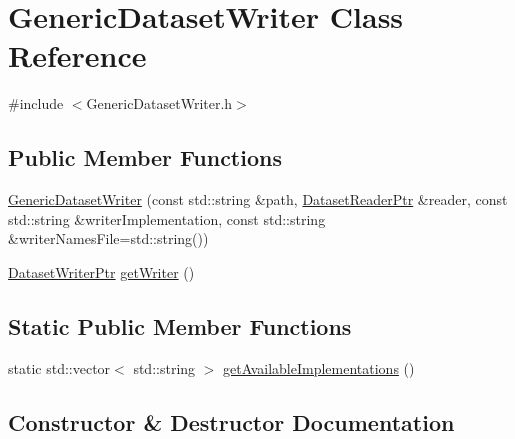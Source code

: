 \hypertarget{class_generic_dataset_writer}{}\section{Generic\+Dataset\+Writer Class Reference}
\label{class_generic_dataset_writer}


{\ttfamily \#include $<$Generic\+Dataset\+Writer.\+h$>$}

\subsection*{Public Member Functions}
\begin{DoxyCompactItemize}
\item 
\hyperlink{class_generic_dataset_writer_a687568a6fff812dca1b41063209b144c}{Generic\+Dataset\+Writer} (const std\+::string \&path, \hyperlink{_dataset_reader_8h_a30d89cba514a220d64d04535c0465f1c}{Dataset\+Reader\+Ptr} \&reader, const std\+::string \&writer\+Implementation, const std\+::string \&writer\+Names\+File=std\+::string())
\item 
\hyperlink{_dataset_writer_8h_a6d016fa40626aa1798ebce934c5d29b0}{Dataset\+Writer\+Ptr} \hyperlink{class_generic_dataset_writer_a56eed0c235998128360dfc4fdc347799}{get\+Writer} ()
\end{DoxyCompactItemize}
\subsection*{Static Public Member Functions}
\begin{DoxyCompactItemize}
\item 
static std\+::vector$<$ std\+::string $>$ \hyperlink{class_generic_dataset_writer_ae2728eb07aa990f39d41aa0d2eee2206}{get\+Available\+Implementations} ()
\end{DoxyCompactItemize}


\subsection{Constructor \& Destructor Documentation}
\mbox{\label{class_generic_dataset_writer_a687568a6fff812dca1b41063209b144c}} 
